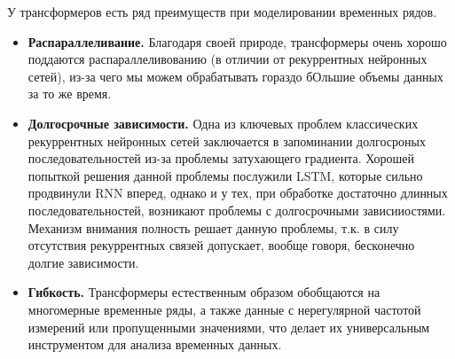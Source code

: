 У трансформеров есть ряд преимуществ при моделировании временных рядов.
\begin{itemize}
    \item \textbf{Распараллеливание.} Благодаря своей природе, трансформеры очень хорошо 
    поддаются распараллеливованию (в отличии от рекуррентных нейронных сетей), из-за 
    чего мы можем обрабатывать гораздо бОльшие объемы данных за то же время.
    \item \textbf{Долгосрочные зависимости.} Одна из ключевых проблем классических 
    рекуррентных нейронных сетей заключается в запоминании долгосроных последовательностей 
    из-за проблемы затухающего градиента. Хорошей попыткой решения данной проблемы 
    послужили LSTM, которые сильно продвинули RNN вперед, однако и у тех, при обработке 
    достаточно длинных последовательностей, возникают проблемы с долгосрочными зависииостями. 
    Механизм внимания полность решает данную проблемы, т.к. в силу отсутствия рекуррентных 
    связей допускает, вообще говоря, бесконечно долгие зависимости.
    \item \textbf{Гибкость.} Трансформеры естественным образом обобщаются на многомерные 
    временные ряды, а также данные с нерегулярной частотой измерений или пропущенными значениями, 
    что делает их универсальным инструментом для анализа временных данных.
\end{itemize}






